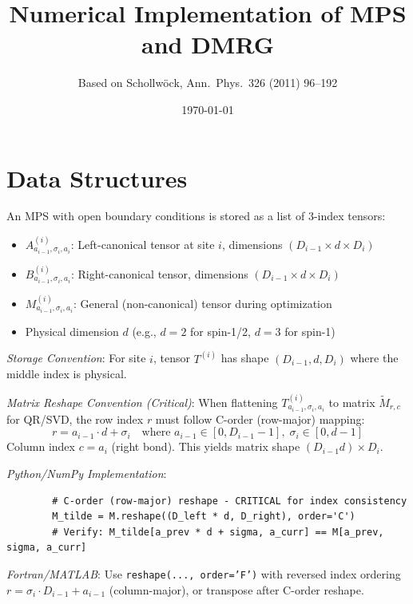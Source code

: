 \documentclass[aps,prb,onecolumn,scriptaddress]{revtex4-2}
\begin{document}
	
	\title{Numerical Implementation of MPS and DMRG}
	\author{Based on Schollw\"{o}ck, Ann.~Phys.~326 (2011) 96--192}
	\date{\today}
	\maketitle
	
	\tableofcontents
	
	\clearpage
	\section{Data Structures}
	
	An MPS with open boundary conditions is stored as a list of 3-index tensors:
	\begin{itemize}
		\item $A^{(i)}_{a_{i-1},\sigma_i,a_i}$: Left-canonical tensor at site $i$,
		dimensions $(D_{i-1} \times d \times D_i)$
		\item $B^{(i)}_{a_{i-1},\sigma_i,a_i}$: Right-canonical tensor,
		dimensions $(D_{i-1} \times d \times D_i)$
		\item $M^{(i)}_{a_{i-1},\sigma_i,a_i}$: General (non-canonical) tensor
		during optimization
		\item Physical dimension $d$ (e.g., $d=2$ for spin-1/2, $d=3$ for spin-1)
	\end{itemize}
	
	\textit{Storage Convention}: For site $i$, tensor $T^{(i)}$ has shape
	$(D_{i-1}, d, D_i)$ where the middle index is physical.
	
	\textit{Matrix Reshape Convention (Critical)}: When flattening
	$T^{(i)}_{a_{i-1},\sigma_i,a_i}$ to matrix $\tilde{M}_{r,c}$ for QR/SVD,
	the row index $r$ must follow C-order (row-major) mapping:
	\begin{equation}
		r = a_{i-1} \cdot d + \sigma_i \quad
		\text{where } a_{i-1} \in [0,D_{i-1}-1],\; \sigma_i \in [0,d-1]
	\end{equation}
	Column index $c = a_i$ (right bond).
	This yields matrix shape $(D_{i-1}d) \times D_i$.
	
	\textit{Python/NumPy Implementation}:
	\begin{verbatim}
		# C-order (row-major) reshape - CRITICAL for index consistency
		M_tilde = M.reshape((D_left * d, D_right), order='C')
		# Verify: M_tilde[a_prev * d + sigma, a_curr] == M[a_prev, sigma, a_curr]
	\end{verbatim}
	\textit{Fortran/MATLAB}: Use \texttt{reshape(..., order='F')} with reversed
	index ordering $r = \sigma_i \cdot D_{i-1} + a_{i-1}$ (column-major), or
	transpose after C-order reshape.
	
\end{document}
